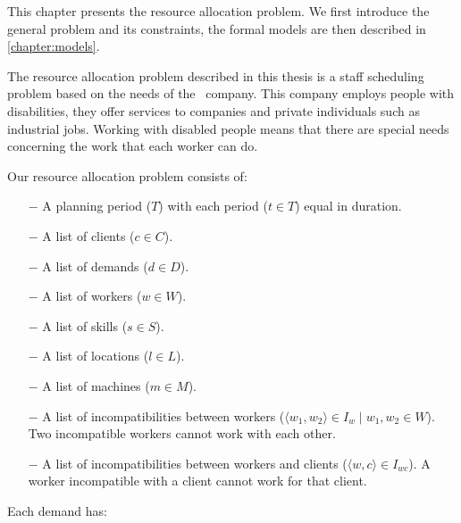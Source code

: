 \documentclass[../thesis.tex]{subfiles}
\begin{document}
This chapter presents the resource allocation problem.
We first introduce the general problem and its constraints, 
the formal models are then described in \autoref{chapter:models}.

The resource allocation problem described in this thesis is a staff scheduling problem based on the needs of the \vone\ company. 
This company employs people with disabilities, they offer services to companies and private individuals such 
as industrial jobs. Working with disabled people means that there are special needs concerning
the work that each worker can do.


Our resource allocation problem consists of:

\begin{itemize}
  \item[$-$] A planning period ($T$) with each period ($t \in T$) equal in duration.
  \item[$-$] A list of clients ($c \in C$). 
  \item[$-$] A list of demands ($d \in D$).
  \item[$-$] A list of workers ($w \in W$). 
  \item[$-$] A list of skills ($s \in S$).
  \item[$-$] A list of locations ($l \in L$).
  \item[$-$] A list of machines ($m \in M$).
  \item[$-$] A list of incompatibilities between workers ($\langle w_1, w_2\rangle \in I_{w} \mid w_1, w_2 \in W$).
  Two incompatible workers cannot work with each other.  
  \item[$-$] A list of incompatibilities between workers and clients ($\langle w, c\rangle \in I_{wc}$).
  A worker incompatible with a client cannot work for that client.
\end{itemize}

Each demand has:
\end{document}
